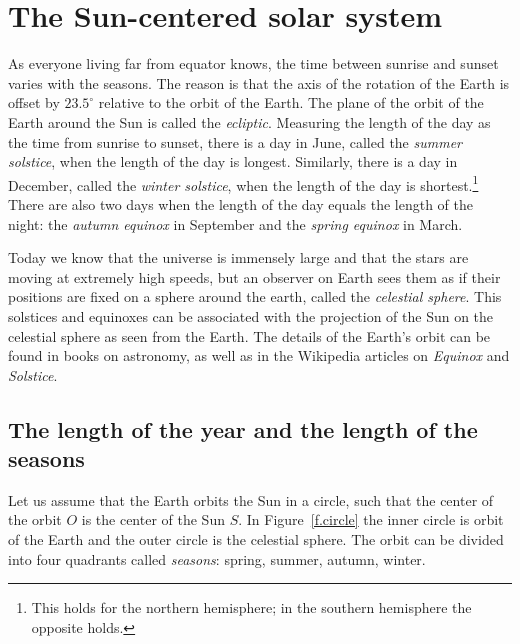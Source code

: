 

\chapter{The Sun-centered solar system}\label{s.copernicus}

As everyone living far from equator knows, the time between sunrise and sunset varies with the seasons. The reason is that the axis of the rotation of the Earth is offset by $23.5^\circ{}$ relative to the orbit of the Earth. The plane of the orbit of the Earth around the Sun is called the \emph{ecliptic}. Measuring the length of the day as the time from sunrise to sunset, there is a day in June, called the \emph{summer solstice}, when the length of the day is longest. Similarly, there is a day in December, called the \emph{winter solstice}, when the length of the day is shortest.\footnote{This holds for the northern hemisphere; in the southern hemisphere the opposite holds.} There are also two days when the length of the day equals the length of the night: the \emph{autumn equinox} in September and the \emph{spring equinox} in March.

Today we know that the universe is immensely large and that the stars are moving at extremely high speeds, but an observer on Earth sees them as if their positions are fixed on a sphere around the earth, called the \emph{celestial sphere}. This solstices and equinoxes can be associated with the projection of the Sun on the celestial sphere as seen from the Earth. The details of the Earth's orbit can be found in books on astronomy, as well as in the Wikipedia articles on \textit{Equinox} and \textit{Solstice}.

\section{The length of the year and the length of the seasons}

Let us assume that the Earth orbits the Sun in a circle, such that the center of the orbit $O$ is the center of the Sun $S$. In Figure~\ref{f.circle} the inner circle is orbit of the Earth and the outer circle is the celestial sphere. The orbit can be divided into four quadrants called \emph{seasons}: spring, summer, autumn, winter.

